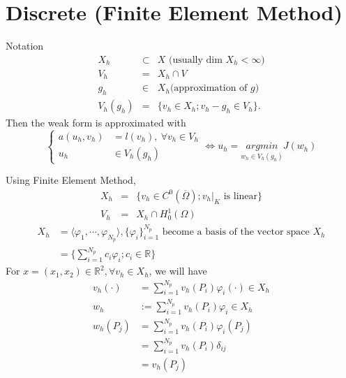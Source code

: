 \documentclass[]{report}
\newcommand{\R}{\mathbb{R}}
\begin{document}
\section{Discrete (Finite Element Method)}
Notation
\begin{eqnarray}\nonumber
X_{h} &\subset & X \text{ (usually dim } X_{h} < \infty \text{)} \\ \nonumber
V_{h} & = & X_{h} \cap V\\ \nonumber
g_{h} & \in & X_{h} \text{(approximation of } g \text{)} \\ \nonumber
V_{h}(g_{h}) & = & \{ v_{h} \in X_{h} ; v_{h}-g_{h} \in V_{h} \}.
\end{eqnarray}
Then the weak form is approximated with
\begin{equation} \nonumber
\begin{cases}
a(u_{h}, v_{h}) &= l(v_{h}), \ \forall v_{h} \in V_{h} \\
u_{h} &\in V_{h}(g_{h})
\end{cases}
\iff u_{h} = \underset{w_{h} \in V_{h}(g_{h})}{argmin}J(w_{h})
\end{equation}

Using Finite Element Method,
\begin{eqnarray}\nonumber
X_{h} &=& \{ v_{h} \in C^{0}(\overline{\Omega}) ; {v_{h}|}_{K} \text{ is linear} \} \\ \nonumber
V_{h} &=& X_{h} \cap H_{0}^{1}(\Omega)
\end{eqnarray}
\begin{align*}
X_h &= \langle \varphi_1, \cdots , \varphi_{N_p} \rangle, \{\varphi_i\}^{N_p}_{i=1} \text{ become a basis of the vector space } X_h\\
&=\{\sum_{i=1}^{N_p} c_i\varphi_i ; c_i \in \R \}
\end{align*}
For $ x = (x_1,x_2) \in \R^2, \forall v_h \in X_h $, we will have
\begin{align*}
v_h (\cdot) &= \sum_{i=1}^{N_p} v_h(P_i) \varphi_i(\cdot) \in X_h\\
w_h &:= \sum_{i=1}^{N_p} v_h(P_i) \varphi_i \in X_h\\
w_h(P_j) &= \sum_{i=1}^{N_p} v_h (P_i) \varphi_i (P_j)\\
&= \sum_{i=1}^{N_p} v_h (P_i) \delta_{ij}\\
&= v_h (P_j)\\
\end{align*}
\end{document}
